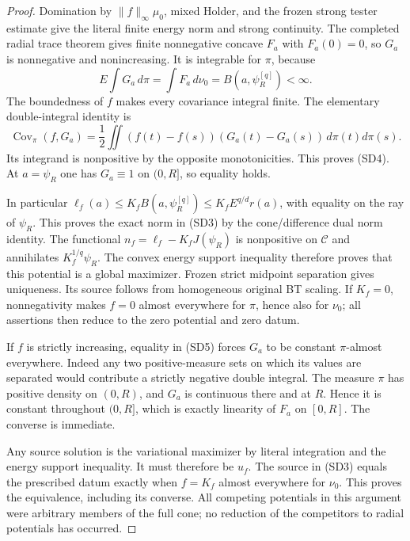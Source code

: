 \documentclass[11pt,a4paper]{article}
\numberwithin{equation}{section}
\theoremstyle{definition}
\theoremstyle{remark}
\begin{document}
\begin{proof}
Domination by $\|f\|_\infty\mu_0$, mixed Holder, and
the frozen strong tester estimate give the literal finite
energy norm and strong continuity.  The completed radial
trace theorem gives finite nonnegative concave $F_a$ with
$F_a(0)=0$, so $G_a$ is nonnegative and nonincreasing.
It is integrable for $\pi$, because
\[
                E\int G_a\,d\pi
                       =\int F_a\,d\nu_0=B(a,\psi_R^{[q]})<\infty.
\]
The boundedness of $f$ makes every covariance integral
finite.  The elementary double-integral identity is
\[
 \operatorname{Cov}_\pi(f,G_a)
   =\frac12\iint(f(t)-f(s))(G_a(t)-G_a(s))\,d\pi(t)d\pi(s).
 \tag{SD5}
\]
Its integrand is nonpositive by the opposite monotonicities.
This proves \textup{(SD4)}.  At $a=\psi_R$ one has
$G_a\equiv1$ on $(0,R]$, so equality holds.

In particular
$\ell_f(a)\le K_f B(a,\psi_R^{[q]})
\le K_f E^{q/d}r(a)$, with equality on the ray
of $\psi_R$.  This proves the exact norm in
\textup{(SD3)} by the cone/difference dual norm identity.
The functional $n_f=\ell_f-K_fJ(\psi_R)$ is nonpositive
on $\mathscr C$ and annihilates $K_f^{1/q}\psi_R$.
The convex energy support inequality therefore proves
that this potential is a global maximizer.  Frozen
strict midpoint separation gives uniqueness.  Its
source follows from homogeneous original BT scaling.
If $K_f=0$, nonnegativity makes $f=0$ almost everywhere
for $\pi$, hence also for $\nu_0$; all assertions then
reduce to the zero potential and zero datum.

If $f$ is strictly increasing, equality in \textup{(SD5)}
forces $G_a$ to be constant $\pi$-almost everywhere.
Indeed any two positive-measure sets on which its values
are separated would contribute a strictly negative
double integral.  The measure $\pi$ has positive density
on $(0,R)$, and $G_a$ is continuous there and at $R$.
Hence it is constant throughout $(0,R]$, which is
exactly linearity of $F_a$ on $[0,R]$.  The converse
is immediate.

Any source solution is the variational maximizer by
literal integration and the energy support inequality.
It must therefore be $u_f$.  The source in
\textup{(SD3)} equals the prescribed datum exactly
when $f=K_f$ almost everywhere for $\nu_0$.
This proves the equivalence, including its converse.
All competing potentials in this argument were arbitrary
members of the full cone; no reduction of the competitors
to radial potentials has occurred.
\end{proof}
\end{document}
